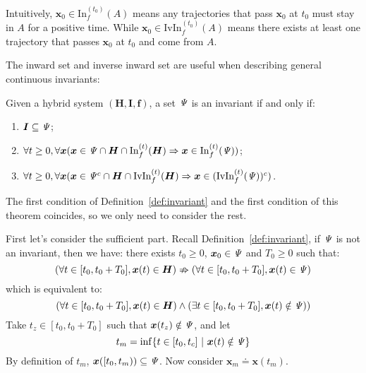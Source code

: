 \documentclass{jssc}
\begin{document}
Intuitively, $\boldsymbol{x}_0 \in \mathrm{In}_f^{(t_0)}(A)$ means any trajectories that pass $\boldsymbol{x}_0$ at $t_0$ must stay in $A$ for a positive time. While $\boldsymbol{x}_0 \in \mathrm{IvIn}_f^{(t_0)}(A)$ means there exists at least one trajectory that passes $\boldsymbol{x}_0$ at $t_0$ and come from $A$.

The inward set and inverse inward set are useful when describing general continuous invariants: 

\begin{theorem}
\label{thm:inIvin}
Given a hybrid system $(\boldsymbol{H}, \boldsymbol{I}, \boldsymbol{f})$, a set ${\it \Psi}$ is an invariant if and only if:
\begin{enumerate}
    \item $\boldsymbol{I} \subseteq {\it \Psi}$;
	\item $\forall t \geq 0, \forall \boldsymbol{x} (\boldsymbol{x} \in {\it \Psi} \cap \boldsymbol{H} \cap \mathrm{In}_f^{(t)}(\boldsymbol{H}) \Rightarrow \boldsymbol{x} \in \mathrm{In}_f^{(t)}({\it \Psi}))$;
	\item $\forall t \geq 0, \forall \boldsymbol{x} (\boldsymbol{x} \in {\it \Psi}^c \cap \boldsymbol{H} \cap \mathrm{IvIn}_f^{(t)}(\boldsymbol{H}) \Rightarrow \boldsymbol{x} \in (\mathrm{IvIn}_f^{(t)}({\it \Psi}))^c)$.
\end{enumerate}
\end{theorem}

\proof
The first condition of Definition~\ref{def:invariant} and the first condition of this theorem coincides, so we only need to consider the rest.

First let's consider the sufficient part. Recall Definition~\ref{def:invariant}, if ${\it \Psi}$ is not an invariant, then we have: there exists $t_0 \geq 0$, $\boldsymbol{x}_0 \in {\it \Psi}$ and $T_0 \geq 0$ such that:
\begin{equation*}
	(\forall t \in [t_0, t_0 + T_0], \boldsymbol{x}(t) \in \boldsymbol{H}) \nRightarrow (\forall t \in [t_0, t_0 + T_0], \boldsymbol{x}(t) \in {\it \Psi})
\end{equation*}
which is equivalent to:
\begin{equation*}
	(\forall t \in [t_0, t_0 + T_0], \boldsymbol{x}(t) \in \boldsymbol{H}) \wedge (\exists t \in [t_0, t_0 + T_0], \boldsymbol{x}(t) \notin {\it \Psi}))
\end{equation*}
Take $t_z \in [t_0, t_0 + T_0]$ such that $\boldsymbol{x}(t_z) \notin {\it \Psi}$, and let
\begin{equation*}
	t_m = \inf \{ t \in [t_0, t_c]\ |\ \boldsymbol{x}(t) \notin {\it \Psi} \}
\end{equation*}
By definition of $t_m$, $\boldsymbol{x}([t_0, t_m)) \subseteq {\it \Psi}$. Now consider $\boldsymbol{x}_m \doteq \boldsymbol{x}(t_m)$.
\end{document}
